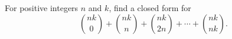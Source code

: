 For positive integers $n$ and $k$, find a closed form for
\[\binom{nk}{0}+\binom{nk}{n}+\binom{nk}{2n}+\cdots+\binom{nk}{nk}.\]
